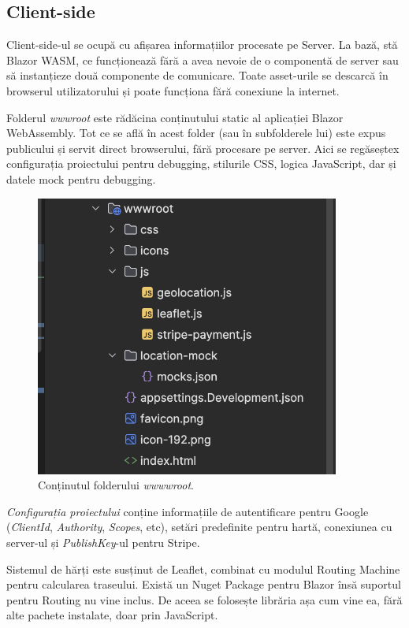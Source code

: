 \subsection{Client-side}

Client-side-ul se ocupă cu afișarea informațiilor procesate pe Server. La bază, stă
Blazor WASM, ce funcționează fără a avea nevoie de o componentă de server sau să instanțieze
două componente de comunicare. Toate asset-urile se descarcă în browserul utilizatorului și poate funcționa fără conexiune la internet.

Folderul \textit{wwwroot} este rădăcina conținutului static al aplicației Blazor WebAssembly.
Tot ce se află în acest folder (sau în subfolderele lui) este expus publicului și servit direct browserului, fără procesare pe server.
Aici se regăseștex configurația proiectului pentru debugging, stilurile CSS, logica JavaScript, dar și datele mock pentru debugging.

\begin{figure}[H]
    \centering
    \includegraphics[width=10cm]{Assets/wwwroot.png}
    \caption{Conținutul folderului \textit{wwwwroot}.}
    \label{fig:wwwroot}
\end{figure}

\textit{Configurația proiectului} conține informațiile de autentificare pentru Google (\textit{ClientId}, \textit{Authority}, \textit{Scopes}, etc),
setări predefinite pentru hartă, conexiunea cu server-ul și \textit{PublishKey}-ul pentru Stripe.

Sistemul de hărți este susținut de Leaflet, combinat cu modulul Routing Machine pentru calcularea traseului.
Există un Nuget Package pentru Blazor însă suportul pentru Routing nu vine inclus. De aceea se folosește librăria așa
cum vine ea, fără alte pachete instalate, doar prin JavaScript.

